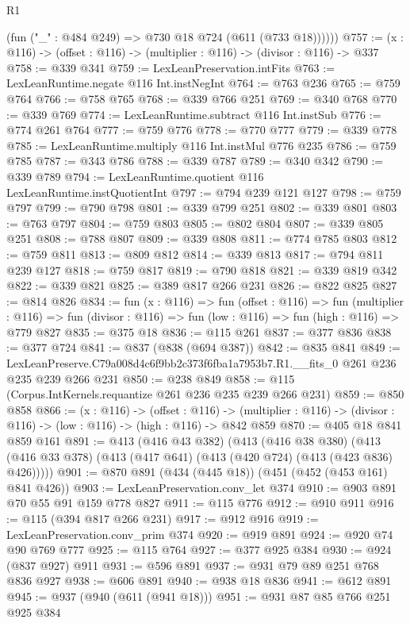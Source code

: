 \begin{lexlean}{R1}
\begin{coremodule}
          (fun ("_" : @484 @249) => @730 @18 @724 (@611 (@733 @18))))))
@757 := (x : @116) -> (offset : @116) -> (multiplier : @116) -> (divisor : @116) -> @337
@758 := @339 @341
@759 := LexLeanPreservation.intFits
@763 := LexLeanRuntime.negate @116 Int.instNegInt
@764 := @763 @236
@765 := @759 @764
@766 := @758 @765
@768 := @339 @766 @251
@769 := @340 @768
@770 := @339 @769
@774 := LexLeanRuntime.subtract @116 Int.instSub
@776 := @774 @261 @764
@777 := @759 @776
@778 := @770 @777
@779 := @339 @778
@785 := LexLeanRuntime.multiply @116 Int.instMul @776 @235
@786 := @759 @785
@787 := @343 @786
@788 := @339 @787
@789 := @340 @342
@790 := @339 @789
@794 := LexLeanRuntime.quotient @116 LexLeanRuntime.instQuotientInt
@797 := @794 @239 @121 @127
@798 := @759 @797
@799 := @790 @798
@801 := @339 @799 @251
@802 := @339 @801
@803 := @763 @797
@804 := @759 @803
@805 := @802 @804
@807 := @339 @805 @251
@808 := @788 @807
@809 := @339 @808
@811 := @774 @785 @803
@812 := @759 @811
@813 := @809 @812
@814 := @339 @813
@817 := @794 @811 @239 @127
@818 := @759 @817
@819 := @790 @818
@821 := @339 @819 @342
@822 := @339 @821
@825 := @389 @817 @266 @231
@826 := @822 @825
@827 := @814 @826
@834 := fun (x : @116) =>
  fun (offset : @116) =>
  fun (multiplier : @116) =>
  fun (divisor : @116) => fun (low : @116) => fun (high : @116) => @779 @827
@835 := @375 @18
@836 := @115 @261
@837 := @377 @836
@838 := @377 @724
@841 := @837 (@838 (@694 @387))
@842 := @835 @841
@849 := LexLeanPreserve.C79a008d4c6f9bb2c373f6fba1a7953b7.R1.__fits_0 @261 @236 @235 @239 @266 @231
@850 := @238 @849
@858 := @115 (Corpus.IntKernels.requantize @261 @236 @235 @239 @266 @231)
@859 := @850 @858
@866 := (x : @116) ->
  (offset : @116) ->
  (multiplier : @116) -> (divisor : @116) -> (low : @116) -> (high : @116) -> @842 @859
@870 := @405 @18 @841 @859 @161
@891 := @413
    (@416 @43 @382)
    (@413
      (@416 @38 @380)
      (@413 (@416 @33 @378) (@413 (@417 @641) (@413 (@420 @724) (@413 (@423 @836) @426)))))
@901 := @870 @891 (@434 (@445 @18)) (@451 (@452 (@453 @161) @841 @426))
@903 := LexLeanPreservation.conv_let @374
@910 := @903 @891 @70 @55 @91 @159 @778 @827
@911 := @115 @776
@912 := @910 @911
@916 := @115 (@394 @817 @266 @231)
@917 := @912 @916
@919 := LexLeanPreservation.conv_prim @374
@920 := @919 @891
@924 := @920 @74 @90 @769 @777
@925 := @115 @764
@927 := @377 @925 @384
@930 := @924 (@837 @927) @911
@931 := @596 @891
@937 := @931 @79 @89 @251 @768 @836 @927
@938 := @606 @891
@940 := @938 @18 @836
@941 := @612 @891
@945 := @937 (@940 (@611 (@941 @18)))
@951 := @931 @87 @85 @766 @251 @925 @384

\end{coremodule}
\end{lexlean}
